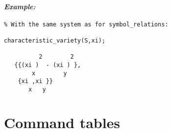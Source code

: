 \paragraph{\it Example:}
\begin{verbatim}
% With the same system as for symbol_relations:

characteristic_variety(S,xi);

          2        2
   {{(xi )  - (xi ) },
        x        y 
    {xi ,xi }}
       x   y
\end{verbatim}










\appendix
\section{Command tables}\label{tables}

